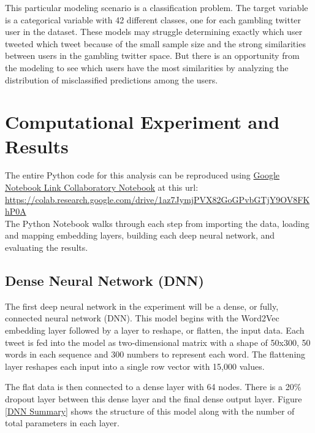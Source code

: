 \documentclass[5p,authoryear]{elsarticle}
\begin{document}
This particular modeling scenario is a classification problem. The target variable is a categorical variable with 42 different classes, one for each gambling twitter user in the dataset. These models may struggle determining exactly which user tweeted which tweet because of the small sample size and the strong similarities between users in the gambling twitter space. But there is an opportunity from the modeling to see which users have the most similarities by analyzing the distribution of misclassified predictions among the users.


\section{Computational Experiment and Results}

The entire Python code for this analysis can be reproduced using \href{https://colab.research.google.com/drive/1az7JymjPVX82GoGPvbGTjY9OV8FKhP0A}{Google Notebook Link Collaboratory Notebook} at this url:\\

\href{https://colab.research.google.com/drive/1az7JymjPVX82GoGPvbGTjY9OV8FKhP0A}{https://colab.research.google.com/drive/1az7JymjPVX82GoGPvbGTjY9OV8FKhP0A} \\


The Python Notebook walks through each step from importing the data, loading and mapping embedding layers, building each deep neural network, and evaluating the results.



\subsection{Dense Neural Network (DNN)}

The first deep neural network in the experiment will be a dense, or fully, connected neural network (DNN). This model begins with the Word2Vec embedding layer followed by a layer to reshape, or flatten, the input data. Each tweet is fed into the model as two-dimensional matrix with a shape of 50x300, 50 words in each sequence and 300 numbers to represent each word. The flattening layer reshapes each input into a single row vector with 15,000 values.

The flat data is then connected to a dense layer with 64 nodes. There is a 20\% dropout layer between this dense layer and the final dense output layer. Figure \ref{DNN Summary} shows the structure of this model along with the number of total parameters in each layer.
\end{document}
